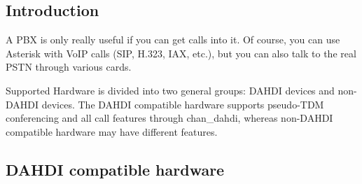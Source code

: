 \subsection{Introduction}

A PBX is only really useful if you can get calls into it.  Of course, you
can use Asterisk with VoIP calls (SIP, H.323, IAX, etc.), but you can also 
talk to the real PSTN through various cards.

Supported Hardware is divided into two general groups:  DAHDI devices and 
non-DAHDI devices.  The DAHDI compatible hardware supports pseudo-TDM 
conferencing and all call features through chan\_dahdi, whereas non-DAHDI 
compatible hardware may have different features.

\subsection{DAHDI compatible hardware}

